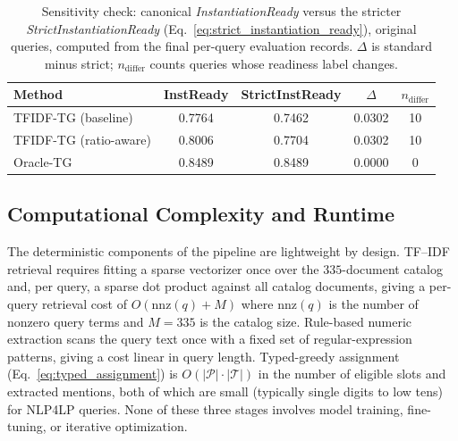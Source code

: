 \documentclass[pdflatex,sn-basic,Numbered]{sn-jnl}
\begin{document}
\begin{table}[t]
\centering
\caption{Sensitivity check: canonical \textit{InstantiationReady} versus the stricter \textit{StrictInstantiationReady} (Eq.~\eqref{eq:strict_instantiation_ready}), original queries, computed from the final per-query evaluation records. $\Delta$ is standard minus strict; $n_{\text{differ}}$ counts queries whose readiness label changes.}
\label{tab:strict-instready}
\small
\begin{tabular}{lcccc}
  \toprule
  Method & InstReady & StrictInstReady & $\Delta$ & $n_{\text{differ}}$ \\
  \midrule
  TFIDF-TG (baseline) & 0.7764 & 0.7462 & 0.0302 & 10 \\
  TFIDF-TG (ratio-aware) & 0.8006 & 0.7704 & 0.0302 & 10 \\
  Oracle-TG & 0.8489 & 0.8489 & 0.0000 & 0 \\
  \bottomrule
\end{tabular}
\end{table}

\subsection{Computational Complexity and Runtime}
\label{subsec:exp_runtime}

The deterministic components of the pipeline are lightweight by design. TF--IDF retrieval requires fitting a sparse vectorizer once over the $335$-document catalog and, per query, a sparse dot product against all catalog documents, giving a per-query retrieval cost of $O(\mathrm{nnz}(q) + M)$ where $\mathrm{nnz}(q)$ is the number of nonzero query terms and $M=335$ is the catalog size. Rule-based numeric extraction scans the query text once with a fixed set of regular-expression patterns, giving a cost linear in query length. Typed-greedy assignment (Eq.~\eqref{eq:typed_assignment}) is $O(|\mathcal{P}| \cdot |\mathcal{T}|)$ in the number of eligible slots and extracted mentions, both of which are small (typically single digits to low tens) for NLP4LP queries. None of these three stages involves model training, fine-tuning, or iterative optimization.
\end{document}
